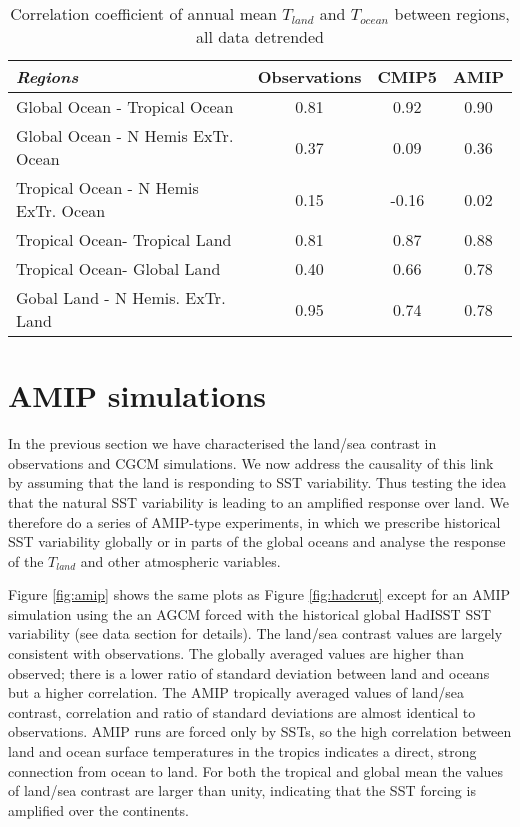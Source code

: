 \begin{center}
	\begin{table}[h]
	\caption{Correlation coefficient of annual mean $T_{land}$ and $T_{ocean}$ 
	between regions, all data detrended}
		\label{tab:crossrel}
	\begin{tabular}{ l  c  c  c}
		\textit{Regions}		&  Observations  & CMIP5 & AMIP \\ \hline
		Global Ocean - Tropical Ocean & 0.81 & 0.92 & 0.90 \\
		Global Ocean - N Hemis ExTr. Ocean & 0.37 & 0.09 & 0.36 \\
		Tropical Ocean - N Hemis ExTr. Ocean & 0.15 & -0.16  & 0.02 \\
		Tropical Ocean- Tropical Land & 0.81 & 0.87 & 0.88 \\
		Tropical Ocean- Global Land & 0.40 & 0.66 & 0.78 \\
		Gobal Land - N Hemis. ExTr. Land & 0.95 & 0.74 & 0.78\\
	\end{tabular}
	\end{table}
\end{center}



\section{AMIP simulations}

In the previous section we have characterised the land/sea contrast in 
observations and CGCM simulations. We now address the causality of this link by 
assuming that the land is responding to SST variability. Thus testing the idea 
that the natural SST variability is leading to an amplified response over land.  
We therefore do a series of AMIP-type experiments, in which we prescribe 
historical SST variability globally or in parts of the global oceans and analyse 
the response of the $T_{land}$ and other atmospheric variables.

Figure \ref{fig:amip} shows the same plots as Figure \ref{fig:hadcrut} except 
for an AMIP simulation using the an AGCM forced with the historical global 
HadISST SST variability (see data section for details). The land/sea contrast 
values are largely consistent with observations. The globally averaged values 
are higher than observed; there is a lower ratio of standard deviation between 
land and oceans but a higher correlation. The AMIP tropically averaged values of 
land/sea contrast, correlation and ratio of standard deviations are almost 
identical to observations. AMIP runs are forced only by SSTs, so the high 
correlation between land and ocean surface temperatures in the tropics indicates 
a direct, strong connection from ocean to land. For both the tropical and global 
mean the values of land/sea contrast are larger than unity, indicating that the 
SST forcing is amplified over the continents.


